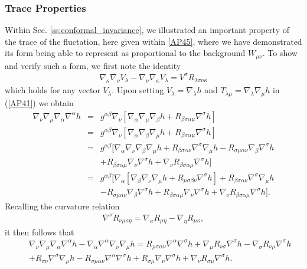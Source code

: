 \subsubsection{Trace Properties}
\label{sss:decoupling_trace_cgauge}
Within Sec. \ref{ss:conformal_invariance}, we illustrated an important property of the trace of the fluctation, here given within \eqref{AP45}, where we have demonstrated its form being able to represent as proportional to the background $W_{\mu\nu}$. To show and verify such a form, we first note the identity 
%
\begin{eqnarray}
\nabla_{\kappa}\nabla_{\nu}V_{\lambda}-\nabla_{\nu}\nabla_{\kappa}V_{\lambda}=V^{\sigma}R_{\lambda\sigma\nu\kappa}
\label{AP46}
\end{eqnarray}
%
which holds for any vector $V_{\lambda}$. Upon setting $V_{\lambda}=\nabla_{\lambda}h$ and $T_{\lambda\mu}=\nabla_{\lambda}\nabla_{\mu}h$ in (\ref{AP41}) we obtain
%
\begin{eqnarray}
\nabla_{\nu}\nabla_{\mu}\nabla_{\alpha}\nabla^{\alpha}h
&=&g^{\alpha\beta}\nabla_{\nu}[\nabla_{\alpha}\nabla_{\mu}\nabla_{\beta}h
+R_{\beta\sigma\alpha\mu}\nabla^{\sigma}h]
\nonumber\\
&=&g^{\alpha\beta}\nabla_{\nu}[\nabla_{\alpha}\nabla_{\beta}\nabla_{\mu}h
+R_{\beta\sigma\alpha\mu}\nabla^{\sigma}h]
\nonumber\\
&=&g^{\alpha\beta}[\nabla_{\alpha}\nabla_{\nu}\nabla_{\beta}\nabla_{\mu}h
+R_{\beta\sigma\alpha\nu}\nabla^{\sigma}\nabla_{\mu}h
-R_{\sigma\mu\alpha\nu}\nabla_{\beta}\nabla^{\sigma}h
\nonumber\\
&&
+R_{\beta\sigma\alpha\mu}\nabla_{\nu}\nabla^{\sigma}h
+\nabla_{\nu}R_{\beta\sigma\alpha\mu}\nabla^{\sigma}h]
\nonumber\\
&=&g^{\alpha\beta}[\nabla_{\alpha}[\nabla_{\beta}\nabla_{\nu}\nabla_{\mu}h
+R_{\mu\sigma\beta\nu}\nabla^{\sigma}h]
+R_{\beta\sigma\alpha\nu}\nabla^{\sigma}\nabla_{\mu}h
\nonumber\\
&&
-R_{\sigma\mu\alpha\nu}\nabla_{\beta}\nabla^{\sigma}h
+R_{\beta\sigma\alpha\mu}\nabla_{\nu}\nabla^{\sigma}h
+\nabla_{\nu}R_{\beta\sigma\alpha\mu}\nabla^{\sigma}h].
\label{AP47}
\end{eqnarray}
%
Recalling the curvature relation 
%
\begin{eqnarray}
\nabla^{\nu}R_{\nu\mu\kappa\eta}=\nabla_{\kappa}R_{\mu\eta}-\nabla_{\eta}R_{\mu\kappa},
\label{AP48}
\end{eqnarray}
%
it then follows that 
%
\begin{eqnarray}
&&\nabla_{\nu}\nabla_{\mu}\nabla_{\alpha}\nabla^{\alpha}h-\nabla_{\alpha}\nabla^{\alpha}\nabla_{\nu}\nabla_{\mu}h
=R_{\mu\sigma\alpha\nu}\nabla^{\alpha}\nabla^{\sigma}h
+\nabla_{\mu}R_{\nu\sigma}\nabla^{\sigma}h
-\nabla_{\sigma}R_{\nu\mu}
\nabla^{\sigma}h\nonumber\\
&&+R_{\sigma\nu}\nabla^{\sigma}\nabla_{\mu}h
-R_{\sigma\mu\alpha\nu}\nabla^{\alpha}\nabla^{\sigma}h
+R_{\sigma\mu}\nabla_{\nu}\nabla^{\sigma}h
+\nabla_{\nu}R_{\sigma\mu}\nabla^{\sigma}h.
\label{AP49}
\end{eqnarray}
